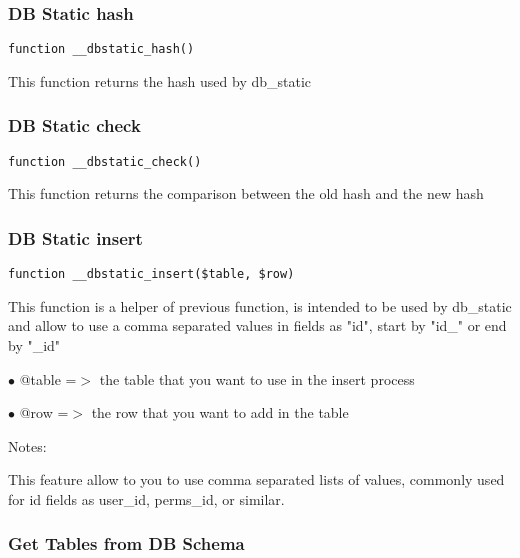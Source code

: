 \documentclass[a4paper]{article}
\begin{document}
\hypertarget{toc411}{}
\subsubsection{DB Static hash}

\begin{lstlisting}
function __dbstatic_hash()
\end{lstlisting}

This function returns the hash used by db\_static

\hypertarget{toc412}{}
\subsubsection{DB Static check}

\begin{lstlisting}
function __dbstatic_check()
\end{lstlisting}

This function returns the comparison between the old hash and the new hash

\hypertarget{toc413}{}
\subsubsection{DB Static insert}

\begin{lstlisting}
function __dbstatic_insert($table, $row)
\end{lstlisting}

This function is a helper of previous function, is intended to be used by db\_static and
allow to use a comma separated values in fields as "id", start by "id\_" or end by "\_id"

\begin{compactitem}
\item[\color{myblue}$\bullet$] @table =$>$ the table that you want to use in the insert process
\item[\color{myblue}$\bullet$] @row   =$>$ the row that you want to add in the table
\end{compactitem}

Notes:

This feature allow to you to use comma separated lists of values, commonly used for id
fields as user\_id, perms\_id, or similar.

\hypertarget{toc414}{}
\subsubsection{Get Tables from DB Schema}
\end{document}
